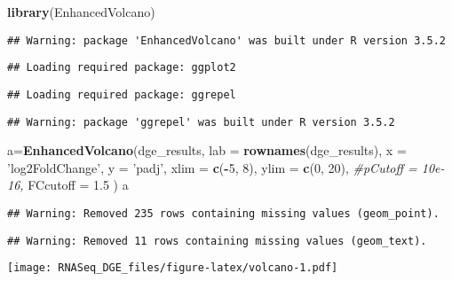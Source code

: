 \documentclass[]{article}
\newenvironment{Shaded}{\begin{snugshade}}{\end{snugshade}}
\newcommand{\KeywordTok}[1]{\textcolor[rgb]{0.13,0.29,0.53}{\textbf{#1}}}
\newcommand{\DataTypeTok}[1]{\textcolor[rgb]{0.13,0.29,0.53}{#1}}
\newcommand{\DecValTok}[1]{\textcolor[rgb]{0.00,0.00,0.81}{#1}}
\newcommand{\FloatTok}[1]{\textcolor[rgb]{0.00,0.00,0.81}{#1}}
\newcommand{\StringTok}[1]{\textcolor[rgb]{0.31,0.60,0.02}{#1}}
\newcommand{\CommentTok}[1]{\textcolor[rgb]{0.56,0.35,0.01}{\textit{#1}}}
\newcommand{\OperatorTok}[1]{\textcolor[rgb]{0.81,0.36,0.00}{\textbf{#1}}}
\newcommand{\NormalTok}[1]{#1}
\begin{document}
\begin{Shaded}
\begin{Highlighting}[]
\KeywordTok{library}\NormalTok{(EnhancedVolcano)}
\end{Highlighting}
\end{Shaded}

\begin{verbatim}
## Warning: package 'EnhancedVolcano' was built under R version 3.5.2
\end{verbatim}

\begin{verbatim}
## Loading required package: ggplot2
\end{verbatim}

\begin{verbatim}
## Loading required package: ggrepel
\end{verbatim}

\begin{verbatim}
## Warning: package 'ggrepel' was built under R version 3.5.2
\end{verbatim}

\begin{Shaded}
\begin{Highlighting}[]
\NormalTok{a=}\KeywordTok{EnhancedVolcano}\NormalTok{(dge_results,}
    \DataTypeTok{lab =} \KeywordTok{rownames}\NormalTok{(dge_results),}
    \DataTypeTok{x =} \StringTok{'log2FoldChange'}\NormalTok{,}
    \DataTypeTok{y =} \StringTok{'padj'}\NormalTok{,}
    \DataTypeTok{xlim =} \KeywordTok{c}\NormalTok{(}\OperatorTok{-}\DecValTok{5}\NormalTok{, }\DecValTok{8}\NormalTok{),}
    \DataTypeTok{ylim =} \KeywordTok{c}\NormalTok{(}\DecValTok{0}\NormalTok{, }\DecValTok{20}\NormalTok{),}
    \CommentTok{#pCutoff = 10e-16,}
    \DataTypeTok{FCcutoff =} \FloatTok{1.5}
\NormalTok{)}
\NormalTok{a}
\end{Highlighting}
\end{Shaded}

\begin{verbatim}
## Warning: Removed 235 rows containing missing values (geom_point).
\end{verbatim}

\begin{verbatim}
## Warning: Removed 11 rows containing missing values (geom_text).
\end{verbatim}

\texttt{[image: RNASeq\_DGE\_files/figure-latex/volcano-1.pdf]}
\end{document}
